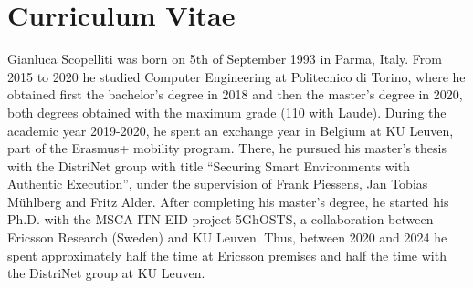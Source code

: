 \chapter{Curriculum Vitae}\label{ch:curriculum}

Gianluca Scopelliti was born on 5th of September 1993 in Parma, Italy. From 2015
to 2020 he studied Computer Engineering at Politecnico di Torino, where he
obtained first the bachelor's degree in 2018 and then the master's degree in
2020, both degrees obtained with the maximum grade (110 with Laude). During the
academic year 2019-2020, he spent an exchange year in Belgium at KU Leuven, part
of the Erasmus+ mobility program. There, he pursued his master's thesis with the
DistriNet group with title ``Securing Smart Environments with Authentic
Execution'', under the supervision of Frank Piessens, Jan Tobias M\"{u}hlberg
and Fritz Alder. After completing his master's degree, he started his Ph.D. with
the MSCA ITN EID project 5GhOSTS, a collaboration between Ericsson Research
(Sweden) and KU Leuven. Thus, between 2020 and 2024 he spent approximately half
the time at Ericsson premises and half the time with the DistriNet group at KU
Leuven.


\cleardoublepage

